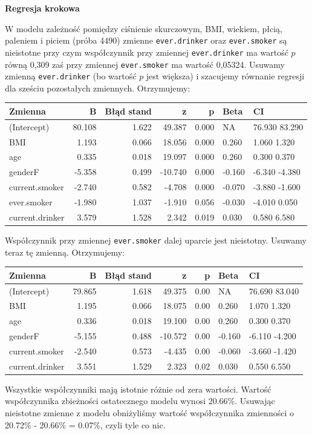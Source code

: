 \documentclass[
  openany]{book}
\begin{document}
\begin{example}
\textbf{Regresja krokowa}

W modelu zależność pomiędzy ciśnienie skurczowym, BMI, wiekiem, płcią, paleniem i piciem
(próba 4490) zmienne \texttt{ever.drinker} oraz \texttt{ever.smoker} są nieistotne przy czym współczynnik
przy zmiennej \texttt{ever.drinker} ma wartość \(p\) równą 0,309 zaś przy zmiennej
\texttt{ever.smoker} ma wartość 0,05324. Usuwamy zmienną \texttt{ever.drinker} (bo wartość \(p\) jest większa)
i szacujemy równanie regresji dla sześciu pozostałych zmiennych. Otrzymujemy:

\begin{tabular}{l|r|r|r|r|l|l}
\hline
Zmienna & B & Błąd stand & z & p & Beta & CI\\
\hline
(Intercept) & 80.108 & 1.622 & 49.387 & 0.000 & NA & 76.930 83.290\\
\hline
BMI & 1.193 & 0.066 & 18.056 & 0.000 & 0.260 & 1.060 1.320\\
\hline
age & 0.335 & 0.018 & 19.097 & 0.000 & 0.260 & 0.300 0.370\\
\hline
genderF & -5.358 & 0.499 & -10.740 & 0.000 & -0.160 & -6.340 -4.380\\
\hline
current.smoker & -2.740 & 0.582 & -4.708 & 0.000 & -0.070 & -3.880 -1.600\\
\hline
ever.smoker & -1.980 & 1.037 & -1.910 & 0.056 & -0.030 & -4.010 0.050\\
\hline
current.drinker & 3.579 & 1.528 & 2.342 & 0.019 & 0.030 & 0.580 6.580\\
\hline
\end{tabular}

Współczynnik przy zmiennej \texttt{ever.smoker} dalej uparcie jest nieistotny. Usuwamy
teraz tę zmienną. Otrzymujemy:

\begin{tabular}{l|r|r|r|r|l|l}
\hline
Zmienna & B & Błąd stand & z & p & Beta & CI\\
\hline
(Intercept) & 79.865 & 1.618 & 49.375 & 0.00 & NA & 76.690 83.040\\
\hline
BMI & 1.195 & 0.066 & 18.075 & 0.00 & 0.260 & 1.070 1.320\\
\hline
age & 0.336 & 0.018 & 19.100 & 0.00 & 0.260 & 0.300 0.370\\
\hline
genderF & -5.155 & 0.488 & -10.572 & 0.00 & -0.160 & -6.110 -4.200\\
\hline
current.smoker & -2.540 & 0.573 & -4.435 & 0.00 & -0.060 & -3.660 -1.420\\
\hline
current.drinker & 3.551 & 1.529 & 2.323 & 0.02 & 0.030 & 0.550 6.550\\
\hline
\end{tabular}

Wszystkie współczynniki mają istotnie różnie od zera wartości. Wartość
współczynnika zbieżności ostatecznego modelu wynosi 20.66\%.
Usuwając nieistotne zmienne z modelu obniżyliśmy wartość
współczynnika zmienności o
20.72\% - 20.66\% = 0.07\%, czyli
tyle co nic.
\end{example}
\end{document}
